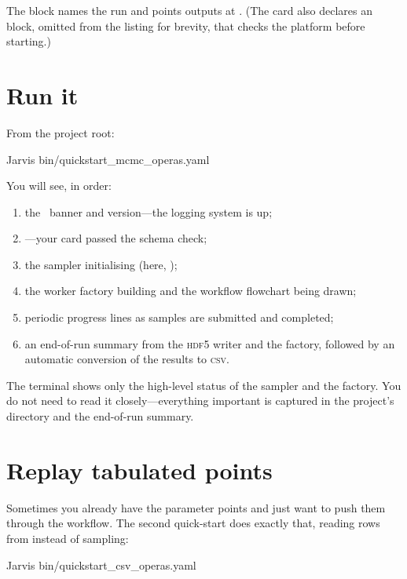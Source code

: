 \noindent The  block names the run and points outputs at .
(The card also declares an  block, omitted from the listing for brevity, that
checks the platform before starting.)

\section{Run it}
\label{sec:run-it}

From the project root:

\begin{shellbox}
Jarvis bin/quickstart_mcmc_operas.yaml
\end{shellbox}

\noindent You will see, in order:

\begin{enumerate}
  \item the \Jarvis\ banner and version---the logging system is up;
  \item {}---your card passed the schema check;
  \item the sampler initialising (here, );
  \item the worker factory building and the workflow flowchart being drawn;
  \item periodic progress lines as samples are submitted and completed;
  \item an end-of-run summary from the \textsc{hdf5} writer and the factory, followed by an
        automatic conversion of the results to \textsc{csv}.
\end{enumerate}

\begin{jtip}
The terminal shows only the high-level status of the sampler and the factory. You do not need
to read it closely---everything important is captured in the project's  directory
and the end-of-run summary.
\end{jtip}

\section{Replay tabulated points}
\label{sec:replay}

Sometimes you already have the parameter points and just want to push them through the
workflow. The second quick-start does exactly that, reading rows from
 instead of sampling:

\begin{shellbox}
Jarvis bin/quickstart_csv_operas.yaml
\end{shellbox}

